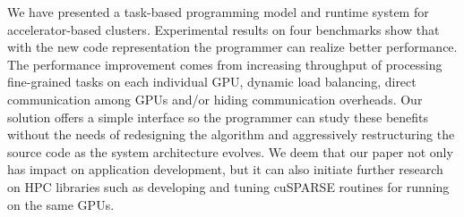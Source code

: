 We have presented a task-based programming model and runtime system for accelerator-based clusters.
Experimental results on four benchmarks show that with the new code representation the programmer can realize better performance.
The performance improvement comes from increasing throughput of processing fine-grained tasks on each individual GPU, dynamic load balancing, direct communication among GPUs and/or hiding communication overheads.
Our solution offers a simple interface so the programmer can study these benefits without the needs of redesigning the algorithm and aggressively restructuring the source code as the system architecture evolves.
We deem that our paper not only has impact on application development, but it can also initiate further research on HPC libraries such as developing and tuning cuSPARSE routines for running on the same GPUs. 
